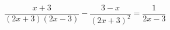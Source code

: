 \begin{ex}[type=equation]
	\begin{condition}
		$\dfrac{x + 3}{(2x + 3)(2x - 3)} - \dfrac{3 - x}{(2x + 3)^2} = \dfrac{1}{2x - 3}$
	\end{condition}
\end{ex}